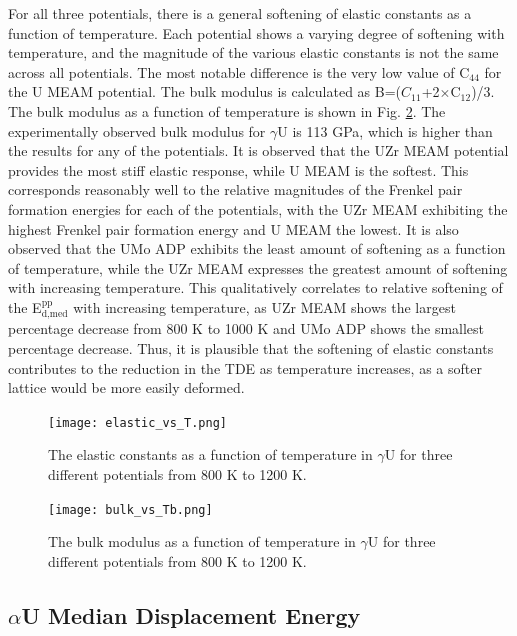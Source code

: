 \documentclass[review]{elsarticle}
\begin{document}
For all three potentials, there is a general softening of elastic constants as a function of temperature. Each potential shows a varying degree of softening with temperature, and the magnitude of the various elastic constants is not the same across all potentials. The most notable difference is the very low value of C$_{44}$ for the U MEAM potential. The bulk modulus is calculated as B=($C_{11}$+2$\times$C$_{12}$)/3. The bulk modulus as a function of temperature is shown in Fig. \ref{fig:bulk}. The experimentally observed bulk modulus for $\gamma$U is 113 GPa\cite{yoo1998}, which is higher than the results for any of the potentials. It is observed that the UZr MEAM potential provides the most stiff elastic response, while U MEAM is the softest. This corresponds reasonably well to the relative magnitudes of the Frenkel pair formation energies for each of the potentials, with the UZr MEAM exhibiting the highest Frenkel pair formation energy and U MEAM the lowest. It is also observed that the UMo ADP exhibits the least amount of softening as a function of temperature, while the UZr MEAM expresses the greatest amount of softening with increasing temperature. This qualitatively correlates to relative softening of the E$^{\textrm{pp}}_{\textrm{d,med}}$ with increasing temperature, as UZr MEAM shows the largest percentage decrease from 800 K to 1000 K and UMo ADP shows the smallest percentage decrease. Thus, it is plausible that the softening of elastic constants contributes to the reduction in the TDE as temperature increases, as a softer lattice would be more easily deformed. 


\begin{figure}[h]
 \centering
 \texttt{[image: elastic\_vs\_T.png]} 
 \caption{The elastic constants as a function of temperature in $\gamma$U for three different potentials from 800 K to 1200 K.}
 \label{fig:elastic}
\end{figure}

\begin{figure}[h]
 \centering
 \texttt{[image: bulk\_vs\_Tb.png]} 
 \caption{The bulk modulus as a function of temperature in $\gamma$U for three different potentials from 800 K to 1200 K.}
 \label{fig:bulk}
\end{figure}

\FloatBarrier

\subsection{$\alpha$U Median Displacement Energy}
\end{document}
